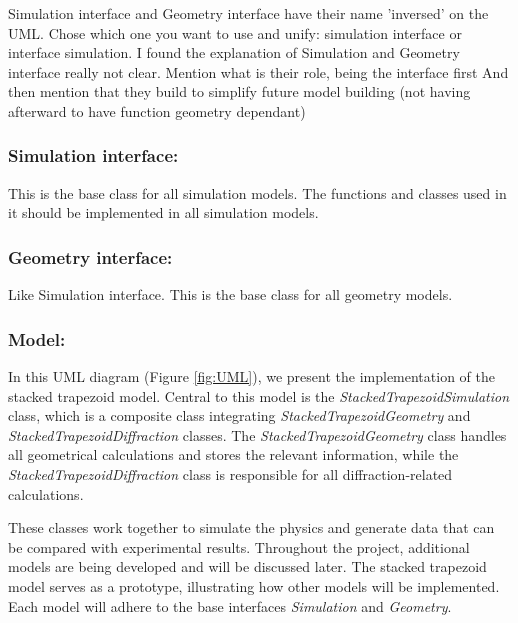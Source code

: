 \FloatBarrier

\color{red}Simulation interface and Geometry interface have their name 'inversed' on the UML. Chose which one you want to use and unify: simulation interface or interface simulation.
I found the explanation of Simulation and Geometry interface really not clear.
Mention what is their role, being the interface first
And then mention that they build to simplify future model building (not having afterward to have function geometry dependant)
\color{black}

\subsubsection*{\textbf{Simulation interface:}}

This is the base class for all simulation models. The functions and classes used in it should be implemented
in all simulation models.

\subsubsection*{\textbf{Geometry interface:}}

Like Simulation interface. This is the base class for all geometry models.


\subsubsection*{\textbf{Model:}}

In this UML diagram (Figure \ref{fig:UML}), we present the implementation of the stacked trapezoid model.
 Central to this model is the \textit{StackedTrapezoidSimulation} class, which is a composite class 
 integrating \textit{StackedTrapezoidGeometry} and \textit{StackedTrapezoidDiffraction} classes. The 
 \textit{StackedTrapezoidGeometry} class handles all geometrical calculations and stores the relevant 
 information, while the \textit{StackedTrapezoidDiffraction} class is responsible for all diffraction-related 
 calculations.

 \medskip

These classes work together to simulate the physics and generate data that can be compared with experimental
results. Throughout the project, additional models are being developed and will be discussed later. The stacked 
trapezoid model serves as a prototype, illustrating how other models will be implemented. Each model will 
adhere to the base interfaces \textit{Simulation} and \textit{Geometry}.

